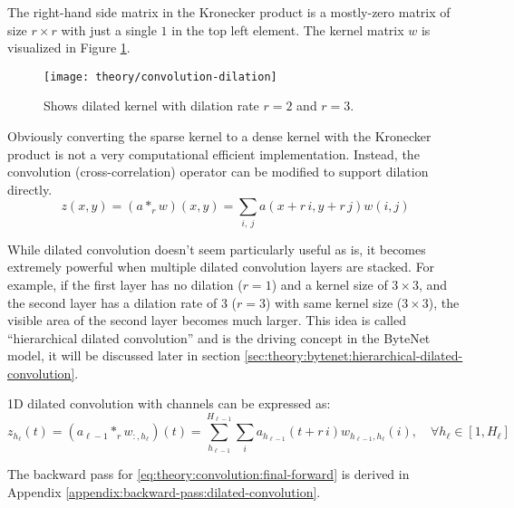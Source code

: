 The right-hand side matrix in the Kronecker product is a mostly-zero matrix of size $r \times r$ with just a single $1$ in the top left element. The kernel matrix $w$ is visualized in Figure \ref{fig:convolution:dilation}.

\begin{figure}[h]
	\centering
	\texttt{[image: theory/convolution-dilation]}
	\caption{Shows dilated kernel with dilation rate $r = 2$ and $r = 3$.}
	\label{fig:convolution:dilation}
\end{figure}

Obviously converting the sparse kernel to a dense kernel with the Kronecker product is not a very computational efficient implementation. Instead, the convolution (cross-correlation) operator can be modified to support dilation directly.
\begin{equation}
z(x, y) = (a *_r w)(x, y) = \sum_{i,\ j} a(x + r\, i, y + r\, j) w(i, j)
\end{equation}

While dilated convolution doesn't seem particularly useful as is, it becomes extremely powerful when multiple dilated convolution layers are stacked. For example, if the first layer has no dilation ($r = 1$) and a kernel size of $3 \times 3$, and the second layer has a dilation rate of 3 ($r = 3$) with same kernel size ($3 \times 3$), the visible area of the second layer becomes much larger. This idea is called ``hierarchical dilated convolution'' and is the driving concept in the ByteNet model, it will be discussed later in section \ref{sec:theory:bytenet:hierarchical-dilated-convolution}.

1D dilated convolution with channels can be expressed as:
\begin{equation}
z_{h_\ell}(t) = (a_{\ell-1} *_r w_{:, h_\ell})(t) = \sum_{h_{\ell-1}}^{H_{\ell-1}} \sum_{i} a_{h_{\ell-1}}(t + r\,i) w_{h_{\ell-1}, h_\ell}(i), \quad \forall h_\ell \in [1, H_\ell]
\label{eq:theory:convolution:final-forward}
\end{equation}

The backward pass for \eqref{eq:theory:convolution:final-forward} is derived in Appendix \ref{appendix:backward-pass:dilated-convolution}.
